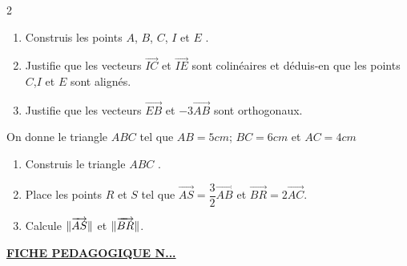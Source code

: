\begin{multicols*}{2}
  	\begin{enumerate}
  		\item  Construis les points $A$, $B$, $C$, $I$ et $E$ .
  		\item Justifie que les vecteurs $\overrightarrow{IC}$ et $\overrightarrow{IE}$ sont colinéaires et déduis-en que les points $C$,$I$ et $E$ sont alignés.
  		\item Justifie que les vecteurs $\overrightarrow{EB}$ et $-3\overrightarrow{AB}$ sont orthogonaux.
  	\end{enumerate}
  	\begin{center}
  	\end{center}
  	On donne le triangle $ABC$ tel que $AB=5cm$; $BC=6cm$ et $AC=4cm$
  	\begin{enumerate}
  		\item  Construis le triangle $ABC$ .
  		\item Place les points $R$ et $S$ tel que $\overrightarrow{AS}=\dfrac{3}{2}\overrightarrow{AB}$ et $\overrightarrow{BR}=2\overrightarrow{AC}$.
  		\item Calcule $\Arrowvert\overrightarrow{AS}\|$ et $\Arrowvert\overrightarrow{BR}\|$.
  	\end{enumerate}
  \end{multicols*}
    \newpage
  \begin{center}
  	\underline{\textbf{\Large FICHE PEDAGOGIQUE N...}}
  \end{center}
